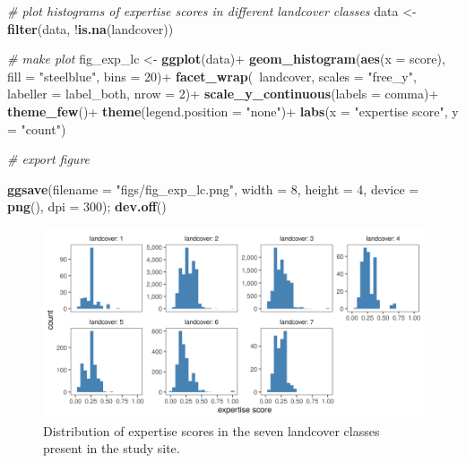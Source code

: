 \documentclass[]{article}
\newenvironment{Shaded}{}{}
\newcommand{\CommentTok}[1]{\textcolor[rgb]{0.38,0.63,0.69}{\textit{#1}}}
\newcommand{\DataTypeTok}[1]{\textcolor[rgb]{0.56,0.13,0.00}{#1}}
\newcommand{\DecValTok}[1]{\textcolor[rgb]{0.25,0.63,0.44}{#1}}
\newcommand{\KeywordTok}[1]{\textcolor[rgb]{0.00,0.44,0.13}{\textbf{#1}}}
\newcommand{\NormalTok}[1]{#1}
\newcommand{\OperatorTok}[1]{\textcolor[rgb]{0.40,0.40,0.40}{#1}}
\newcommand{\StringTok}[1]{\textcolor[rgb]{0.25,0.44,0.63}{#1}}
\begin{document}
\begin{Shaded}
\begin{Highlighting}[]
\CommentTok{# plot histograms of expertise scores in different landcover classes}
\NormalTok{data <-}\StringTok{ }\KeywordTok{filter}\NormalTok{(data, }\OperatorTok{!}\KeywordTok{is.na}\NormalTok{(landcover))}

\CommentTok{# make plot}
\NormalTok{fig_exp_lc <-}\StringTok{ }\KeywordTok{ggplot}\NormalTok{(data)}\OperatorTok{+}
\StringTok{  }\KeywordTok{geom_histogram}\NormalTok{(}\KeywordTok{aes}\NormalTok{(}\DataTypeTok{x =}\NormalTok{ score), }\DataTypeTok{fill =} \StringTok{"steelblue"}\NormalTok{, }\DataTypeTok{bins =} \DecValTok{20}\NormalTok{)}\OperatorTok{+}
\StringTok{  }\KeywordTok{facet_wrap}\NormalTok{(}\OperatorTok{~}\NormalTok{landcover, }\DataTypeTok{scales =} \StringTok{"free_y"}\NormalTok{, }\DataTypeTok{labeller =}\NormalTok{ label_both, }\DataTypeTok{nrow =} \DecValTok{2}\NormalTok{)}\OperatorTok{+}
\StringTok{  }\KeywordTok{scale_y_continuous}\NormalTok{(}\DataTypeTok{labels =}\NormalTok{ comma)}\OperatorTok{+}
\StringTok{  }\KeywordTok{theme_few}\NormalTok{()}\OperatorTok{+}
\StringTok{  }\KeywordTok{theme}\NormalTok{(}\DataTypeTok{legend.position =} \StringTok{"none"}\NormalTok{)}\OperatorTok{+}
\StringTok{  }\KeywordTok{labs}\NormalTok{(}\DataTypeTok{x =} \StringTok{"expertise score"}\NormalTok{, }\DataTypeTok{y =} \StringTok{"count"}\NormalTok{)}

\CommentTok{# export figure}

\KeywordTok{ggsave}\NormalTok{(}\DataTypeTok{filename =} \StringTok{"figs/fig_exp_lc.png"}\NormalTok{, }\DataTypeTok{width =} \DecValTok{8}\NormalTok{, }\DataTypeTok{height =} \DecValTok{4}\NormalTok{, }\DataTypeTok{device =} \KeywordTok{png}\NormalTok{(), }\DataTypeTok{dpi =} \DecValTok{300}\NormalTok{); }\KeywordTok{dev.off}\NormalTok{()}
\end{Highlighting}
\end{Shaded}

\begin{figure}
\centering
\includegraphics{figs/fig_exp_lc.png}
\caption{Distribution of expertise scores in the seven landcover classes present in the study site.}
\end{figure}
\end{document}
